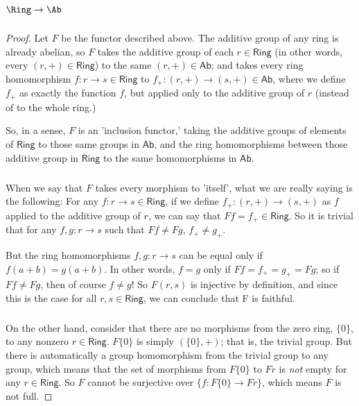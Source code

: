 \documentclass[../../main]{subfiles}
\begin{document}
\subparagraph{\(\Ring\to\Ab\)}
\begin{proof}
	Let \(F\) be the functor described above. The additive group of any ring is
	already abelian, so \(F\)  takes the additive group of each \(r \in
	\textsf{Ring}\) (in other words, every \((r, +) \in \textsf{Ring}\)) to the
	same \((r, +) \in \textsf{Ab}\); and takes every ring homomorphism \(f
	\colon r \to s \in \textsf{Ring}\) to \(f_+ \colon (r, +) \to (s, +) \in
	\textsf{Ab}\),  where we define \(f_+\) as exactly the function \(f\), but
	applied only to the additive group of \(r\) (instead of to the whole ring.)

	So, in a sense, \(F\) is an 'inclusion functor,' taking the additive groups of
	elements of \(\textsf{Ring}\) to those same groups in \(\textsf{Ab}\), and the
	ring homomorphisms between those additive group in \(\textsf{Ring}\) to the same
	homomorphisms in \(\textsf{Ab}\).


	\subparagraph{}
	When we say that \(F\) takes every morphism to 'itself', what we are really
	saying is the following: For any \(f \colon r \to s \in \textsf{Ring}\), if
	we define \(f_+ \colon (r, +) \to (s, +)\) as \(f\) applied to the additive
	group of \(r\), we can say that \(Ff = f_+\in \textsf{Ring}\). So it is
	trivial that for any \(f, g \colon r \to s\) such that \(Ff \neq Fg\), \(f_+
	\neq g_+\).

	But the ring homomorphisms \(f, g \colon r \to s\) can be equal only if
	\(f(a+b) = g(a+b)\). In other words, \(f = g \) only if \(Ff = f_+ = g_+ =
	Fg\); so if \(Ff \neq Fg\), then of course \(f \neq g \)! So \(F(r, s)\) is
	injective by definition, and since this is the case for all \(r, s \in
	\textsf{Ring}\), we can conclude that F is faithful.


	\subparagraph{}
	On the other hand, consider that there are no morphisms from the zero ring,
	\(\{0\}\), to any nonzero \(r \in \textsf{Ring}\). \(F\{0\}\) is simply
	\((\{0\}, +)\); that is, the trivial group. But there is automatically a
	group homomorphism from the trivial group to any group, which means that the
	set of morphisms from \(F\{0\}\) to \(Fr\) is \textit{not} empty for any \(r
	\in \textsf{Ring}\). So \(F\) cannot be surjective over \(\{f : F\{0\} \to
	Fr\}\), which means \(F\) is not full.


\end{proof}
\end{document}
